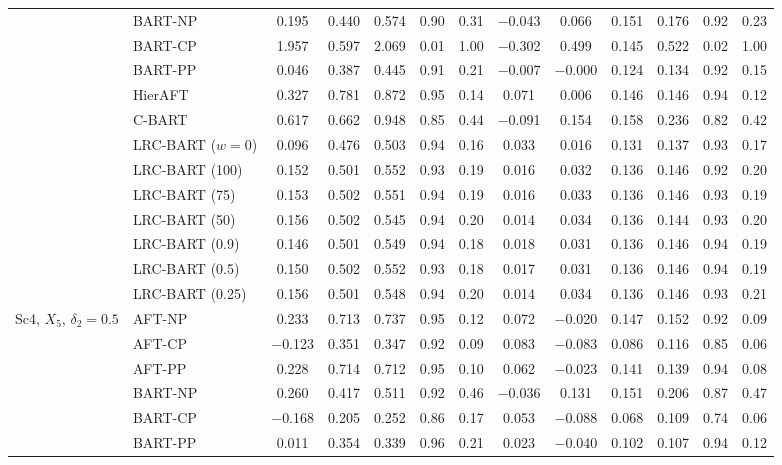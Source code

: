 \begin{center}
\begin{longtable}{llccccccccccc}
& BART-NP & 0.195 & 0.440 & 0.574 & 0.90 & 0.31 & $-$0.043 & 0.066 & 0.151 & 0.176 & 0.92 & 0.23 \\
& BART-CP & 1.957 & 0.597 & 2.069 & 0.01 & 1.00 & $-$0.302 & 0.499 & 0.145 & 0.522 & 0.02 & 1.00 \\
& BART-PP & 0.046 & 0.387 & 0.445 & 0.91 & 0.21 & $-$0.007 & $-$0.000 & 0.124 & 0.134 & 0.92 & 0.15 \\
& HierAFT & 0.327 & 0.781 & 0.872 & 0.95 & 0.14 & 0.071 & 0.006 & 0.146 & 0.146 & 0.94 & 0.12 \\
& C-BART & 0.617 & 0.662 & 0.948 & 0.85 & 0.44 & $-$0.091 & 0.154 & 0.158 & 0.236 & 0.82 & 0.42 \\
& LRC-BART ($w=0$) & 0.096 & 0.476 & 0.503 & 0.94 & 0.16 & 0.033 & 0.016 & 0.131 & 0.137 & 0.93 & 0.17 \\
& LRC-BART (100) & 0.152 & 0.501 & 0.552 & 0.93 & 0.19 & 0.016 & 0.032 & 0.136 & 0.146 & 0.92 & 0.20 \\
& LRC-BART (75) & 0.153 & 0.502 & 0.551 & 0.94 & 0.19 & 0.016 & 0.033 & 0.136 & 0.146 & 0.93 & 0.19 \\
& LRC-BART (50) & 0.156 & 0.502 & 0.545 & 0.94 & 0.20 & 0.014 & 0.034 & 0.136 & 0.144 & 0.93 & 0.20 \\
& LRC-BART (0.9) & 0.146 & 0.501 & 0.549 & 0.94 & 0.18 & 0.018 & 0.031 & 0.136 & 0.146 & 0.94 & 0.19 \\
& LRC-BART (0.5) & 0.150 & 0.502 & 0.552 & 0.93 & 0.18 & 0.017 & 0.031 & 0.136 & 0.146 & 0.94 & 0.19 \\
& LRC-BART (0.25) & 0.156 & 0.501 & 0.548 & 0.94 & 0.20 & 0.014 & 0.034 & 0.136 & 0.146 & 0.93 & 0.21 \\
\midrule
\multirow{15}{*}{Sc4, $X_5$, $\delta_2=0.5$} & AFT-NP & 0.233 & 0.713 & 0.737 & 0.95 & 0.12 & 0.072 & $-$0.020 & 0.147 & 0.152 & 0.92 & 0.09 \\
& AFT-CP & $-$0.123 & 0.351 & 0.347 & 0.92 & 0.09 & 0.083 & $-$0.083 & 0.086 & 0.116 & 0.85 & 0.06 \\
& AFT-PP & 0.228 & 0.714 & 0.712 & 0.95 & 0.10 & 0.062 & $-$0.023 & 0.141 & 0.139 & 0.94 & 0.08 \\
& BART-NP & 0.260 & 0.417 & 0.511 & 0.92 & 0.46 & $-$0.036 & 0.131 & 0.151 & 0.206 & 0.87 & 0.47 \\
& BART-CP & $-$0.168 & 0.205 & 0.252 & 0.86 & 0.17 & 0.053 & $-$0.088 & 0.068 & 0.109 & 0.74 & 0.06 \\
& BART-PP & 0.011 & 0.354 & 0.339 & 0.96 & 0.21 & 0.023 & $-$0.040 & 0.102 & 0.107 & 0.94 & 0.12 \\

\end{longtable}
\end{center}
